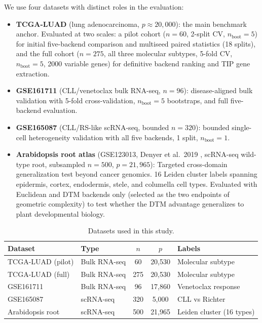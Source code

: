 \documentclass[11pt]{article}
\begin{document}
We use four datasets with distinct roles in the evaluation:
\begin{itemize}[leftmargin=1.5em]
\item \textbf{TCGA-LUAD} (lung adenocarcinoma, $p \approx 20{,}000$): the main benchmark anchor.
Evaluated at two scales: a pilot cohort ($n = 60$, 2-split CV, $n_{\text{boot}} = 5$) for initial five-backend comparison and multiseed paired statistics (18 splits), and the full cohort ($n = 275$, all three molecular subtypes, 5-fold CV, $n_{\text{boot}} = 5$, 2000 variable genes) for definitive backend ranking and TIP gene extraction.
\item \textbf{GSE161711} (CLL/venetoclax bulk RNA-seq, $n = 96$): disease-aligned bulk validation with 5-fold cross-validation, $n_{\text{boot}} = 5$ bootstraps, and full five-backend evaluation.
\item \textbf{GSE165087} (CLL/RS-like scRNA-seq, bounded $n = 320$): bounded single-cell heterogeneity validation with all five backends, 1 split, $n_{\text{boot}} = 1$.
\item \textbf{Arabidopsis root atlas} (GSE123013, Denyer et al.\ 2019 \cite{denyer2019}, scRNA-seq wild-type root, subsampled $n = 500$, $p = 21{,}965$): Targeted cross-domain generalization test beyond cancer genomics. 16 Leiden cluster labels spanning epidermis, cortex, endodermis, stele, and columella cell types. Evaluated with Euclidean and DTM backends only (selected as the two endpoints of geometric complexity) to test whether the DTM advantage generalizes to plant developmental biology.
\end{itemize}

\begin{table}[h]
\centering\small
\begin{tabular}{llccl}
\toprule
Dataset & Type & $n$ & $p$ & Labels \\
\midrule
TCGA-LUAD (pilot) & Bulk RNA-seq & 60 & 20,530 & Molecular subtype \\
TCGA-LUAD (full) & Bulk RNA-seq & 275 & 20,530 & Molecular subtype \\
GSE161711 & Bulk RNA-seq & 96 & 17,860 & Venetoclax response \\
GSE165087 & scRNA-seq & 320 & 5,000 & CLL vs Richter \\
Arabidopsis root & scRNA-seq & 500 & 21,965 & Leiden cluster (16 types) \\
\bottomrule
\end{tabular}
\caption{Datasets used in this study.}
\label{tab:datasets}
\end{table}
\end{document}
